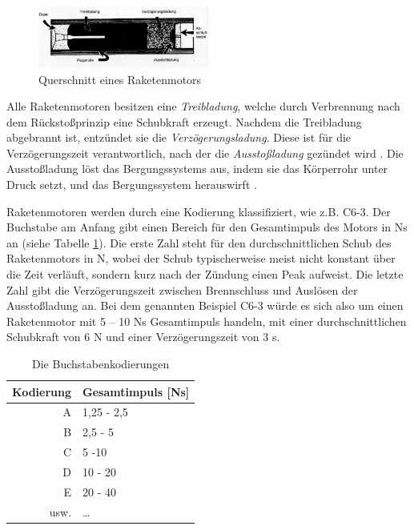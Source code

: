 \documentclass[10pt,a4paper]{article}
\begin{document}
\begin{figure}[h]
	\centering
	\includegraphics[width=0.5\textwidth]{Bilder/Raketenmotor-Schema.png}
	\caption{Querschnitt eines Raketenmotors \cite{om}}
\end{figure}

\noindent
Alle Raketenmotoren besitzen eine \textit{Treibladung}, welche durch Verbrennung nach dem Rückstoßprinzip eine Schubkraft erzeugt.
Nachdem die Treibladung abgebrannt ist, entzündet sie die \textit{Verzögerungsladung}. Diese ist für die Verzögerungszeit verantwortlich, nach der die \textit{Ausstoßladung} gezündet wird \cite{sn}.
Die Ausstoßladung löst das  Bergungssystems aus, indem sie das Körperrohr unter Druck setzt, und das Bergungssystem herauswirft \cite{om}.

Raketenmotoren werden durch eine Kodierung klassifiziert, wie z.B. \textsf{C6-3}. Der Buchstabe am Anfang gibt einen Bereich für den Gesamtimpuls des Motors in Ns an (siehe Tabelle \ref{tab-Motorkodierungen}).
Die erste Zahl steht für den durchschnittlichen Schub des Raketenmotors in N, wobei der Schub typischerweise meist nicht konstant über die Zeit verläuft, sondern kurz nach der Zündung einen Peak aufweist.
Die letzte Zahl gibt die Verzögerungszeit zwischen Brennschluss und Auslösen der Ausstoßladung an. Bei dem genannten Beispiel \textsf{C6-3} würde es sich also um einen Raketenmotor mit 5 -- 10 Ns Gesamtimpuls handeln, mit einer durchschnittlichen Schubkraft von 6 N und einer Verzögerungszeit von 3 s. 

\begin{table}[H]
\caption{Die Buchstabenkodierungen}
\label{tab-Motorkodierungen}
\centering
\begin{tabular}{r|l}
	\toprule
	Kodierung & Gesamtimpuls [Ns] \\
	\midrule
	A & 1,25 - 2,5 \\
	B & 2,5 - 5 \\
	C & 5 -10 \\
	D & 10 - 20 \\
	E & 20 - 40 \\
	usw. & \dots \\
	\bottomrule
\end{tabular}
\end{table}
\end{document}
